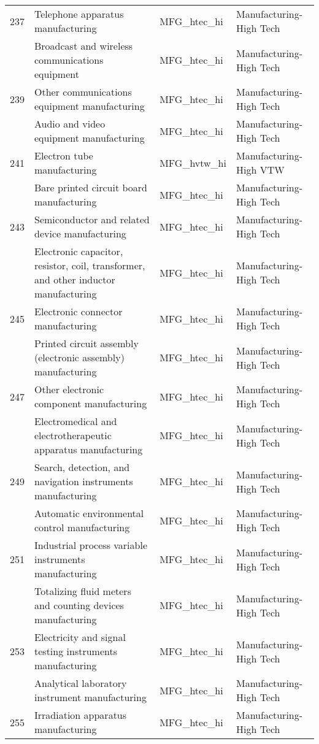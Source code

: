 \begin{landscape}
\begin{small}
\begin{longtable}{clll}
237 & Telephone apparatus manufacturing & MFG\_htec\_hi & Manufacturing-High Tech \\
\gray 238 & Broadcast and wireless communications equipment & MFG\_htec\_hi & Manufacturing-High Tech \\
239 & Other communications equipment manufacturing & MFG\_htec\_hi & Manufacturing-High Tech \\
\gray 240 & Audio and video equipment manufacturing & MFG\_htec\_hi & Manufacturing-High Tech \\
241 & Electron tube manufacturing & MFG\_hvtw\_hi & Manufacturing-High VTW \\
\gray 242 & Bare printed circuit board manufacturing & MFG\_htec\_hi & Manufacturing-High Tech \\
243 & Semiconductor and related device manufacturing & MFG\_htec\_hi & Manufacturing-High Tech \\
\gray 244 & Electronic capacitor, resistor, coil, transformer, and other inductor manufacturing & MFG\_htec\_hi & Manufacturing-High Tech \\
245 & Electronic connector manufacturing & MFG\_htec\_hi & Manufacturing-High Tech \\
\gray 246 & Printed circuit assembly (electronic assembly) manufacturing & MFG\_htec\_hi & Manufacturing-High Tech \\
247 & Other electronic component manufacturing & MFG\_htec\_hi & Manufacturing-High Tech \\
\gray 248 & Electromedical and electrotherapeutic apparatus manufacturing & MFG\_htec\_hi & Manufacturing-High Tech \\
249 & Search, detection, and navigation instruments manufacturing & MFG\_htec\_hi & Manufacturing-High Tech \\
\gray 250 & Automatic environmental control manufacturing & MFG\_htec\_hi & Manufacturing-High Tech \\
251 & Industrial process variable instruments manufacturing & MFG\_htec\_hi & Manufacturing-High Tech \\
\gray 252 & Totalizing fluid meters and counting devices manufacturing & MFG\_htec\_hi & Manufacturing-High Tech \\
253 & Electricity and signal testing instruments manufacturing & MFG\_htec\_hi & Manufacturing-High Tech \\
\gray 254 & Analytical laboratory instrument manufacturing & MFG\_htec\_hi & Manufacturing-High Tech \\
255 & Irradiation apparatus manufacturing & MFG\_htec\_hi & Manufacturing-High Tech \\

\end{longtable}
\end{small}
\end{landscape}
